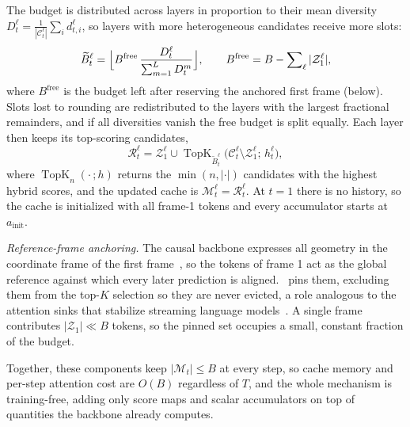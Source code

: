 The budget is distributed across layers in proportion to their mean diversity $D^{\ell}_{t}=\frac{1}{|\mathcal{C}^{\ell}_{t}|}\sum_{i} d^{\ell}_{t,i}$, so layers with more heterogeneous candidates receive more slots:
\begin{equation}
\widetilde{B}^{\ell}_{t}
= \Bigl\lfloor
B^{\mathrm{free}}\,
\frac{D^{\ell}_{t}}{\sum_{m=1}^{L} D^{m}_{t}}
\Bigr\rfloor,
\qquad
B^{\mathrm{free}} = B - \sum\nolimits_{\ell} |\mathcal{Z}^{\ell}_{1}|,
\label{eq:allocation}
\end{equation}
where $B^{\mathrm{free}}$ is the budget left after reserving the anchored first frame (below). Slots lost to rounding are redistributed to the layers with the largest fractional remainders, and if all diversities vanish the free budget is split equally. Each layer then keeps its top-scoring candidates,
\begin{equation}
\mathcal{R}^{\ell}_{t}
= \mathcal{Z}^{\ell}_{1} \cup
\operatorname{TopK}_{\widetilde{B}^{\ell}_{t}}\!
\bigl(\mathcal{C}^{\ell}_{t}\setminus\mathcal{Z}^{\ell}_{1};\, h^{\ell}_{t}\bigr),
\label{eq:retention}
\end{equation}
where $\operatorname{TopK}_{n}(\cdot\,;h)$ returns the $\min(n,|\cdot|)$ candidates with the highest hybrid scores, and the updated cache is $\mathcal{M}^{\ell}_{t}=\mathcal{R}^{\ell}_{t}$. At $t{=}1$ there is no history, so the cache is initialized with all frame-1 tokens and every accumulator starts at $a_{\mathrm{init}}$.

\textit{Reference-frame anchoring.} The causal backbone expresses all geometry in the coordinate frame of the first frame~\cite{zhuo2025streamvggt}, so the tokens of frame 1 act as the global reference against which every later prediction is aligned. \method\ pins them, excluding them from the top-$K$ selection so they are never evicted, a role analogous to the attention sinks that stabilize streaming language models~\cite{xiao2024streamingllm}. A single frame contributes $|\mathcal{Z}_1|\ll B$ tokens, so the pinned set occupies a small, constant fraction of the budget.

Together, these components keep $|\mathcal{M}_t|\le B$ at every step, so cache memory and per-step attention cost are $O(B)$ regardless of $T$, and the whole mechanism is training-free, adding only score maps and scalar accumulators on top of quantities the backbone already computes.
